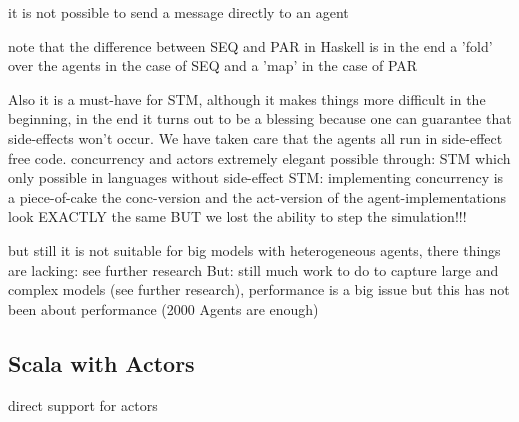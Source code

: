 it is not possible to send a message directly to an agent

note that the difference between SEQ and PAR in Haskell is in the end a 'fold' over the agents in the case of SEQ and a 'map' in the case of PAR

Also it is a must-have for STM, although it makes things more difficult in the beginning, in the end it turns out to be a blessing because one can guarantee that side-effects won't occur. We have taken care that the agents all run in side-effect free code.
concurrency and actors extremely elegant possible through: STM which only possible in languages without side-effect	
STM: implementing concurrency is a piece-of-cake
the conc-version and the act-version of the agent-implementations look EXACTLY the same	 BUT we lost the ability to step the simulation!!!

but still it is not suitable for big models with heterogeneous agents, there things are lacking: see further research
But: still much work to do to capture large and complex models (see further research), performance is a big issue but this has not been about performance (2000 Agents are enough)

\subsection{Scala with Actors}
direct support for actors